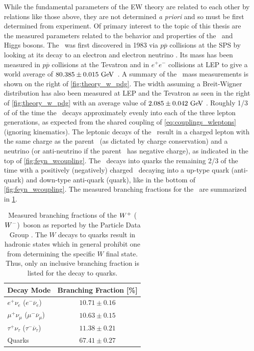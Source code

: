 While the fundamental parameters of the EW theory are related to each other
by relations like those above, they are not determined \emph{a priori} 
and so must be first determined from experiment.
Of primary interest to the topic of this thesis 
are the measured parameters related to the behavior and properties
of the \dubya~and Higgs bosons.
The \dubya~was first discovered in 1983 via $p\overline{p}$ collisions
at the SPS by looking at its decay to an electron %
and electron neutrino \cite{ARNISON1983103}.
Its mass has been measured in $p\overline{p}$ collisions at the Tevatron
and in $e^{+}e^{-}$ collisions at LEP to give a world 
average of $80.385 \pm 0.015\GeV$~\cite{PDG:2014}.
A summary of the \dubya~mass measurements is shown on 
the right of \fig\ref{fig:theory_w_pdg}.
The width assuming a Breit-Wigner distribution has also been measured 
at LEP and the Tevatron as seen in the right of \fig\ref{fig:theory_w_pdg}
with an average value of $2.085\pm0.042\GeV$ \cite{PDG:2014}.
Roughly 1/3 of of the time the \dubya~decays approximately 
evenly into each of the three lepton generations,
as expected from the shared coupling of \eqn\eqref{eq:couplings_wleptons}
(ignoring kinematics).
The leptonic decays of the \dubya~result in a charged lepton 
with the same charge as the parent \dubya~(as dictated by charge conservation)
and a neutrino (or anti-neutrino if the parent \dubya~has negative charge),
as indicated in the top of \fig\ref{fig:feyn_wcoupling}.
The \dubya~decays into quarks the remaining 2/3 of the time with a positively
(negatively) charged \dubya~decaying into a up-type quark (anti-quark) 
and down-type anti-quark (quark),
like in the bottom of \fig\ref{fig:feyn_wcoupling}.
The measured branching fractions for the \dubya~are 
summarized in \tab\ref{tab:theory_wdecay}.

\begin{table}[ht]
\centering
\begin{tabular}{l|c}
Decay Mode &  Branching Fraction [\%]\\
\hline
$e^+\nu_e$ ($e^-\overline{\nu}_e$) & $10.71 \pm 0.16$ \\
$\mu^+\nu_{\mu}$ ($\mu^-\overline{\nu}_{\mu}$) & $10.63 \pm 0.15$\\
$\tau^+\nu_{\tau}$ ($\tau^-\overline{\nu}_{\tau}$) & $11.38 \pm 0.21$\\
Quarks & $67.41 \pm 0.27$\\
\end{tabular}
\caption{Measured branching fractions of the $W^+$ ($W^-$)~boson 
as reported by the Particle Data Group \cite{PDG:2014}.  The $W$ decays
to quarks result in hadronic states which in general prohibit
one from determining the specific $W$ final state. Thus, only 
an inclusive branching fraction is listed for the decay to quarks.}
\label{tab:theory_wdecay}
\end{table}


